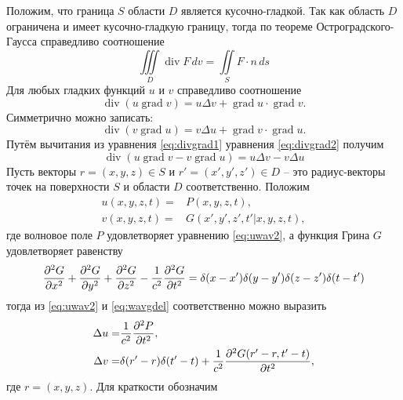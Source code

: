 \documentclass[a4paper, fontsize=14pt]{article}
\newcommand{\divop}{\operatorname{div}}
\newcommand{\gradop}{\operatorname{grad}}
\begin{document}
	 Положим, что граница $S$ области $D$ является кусочно-гладкой. Так как область $D$ ограничена и имеет кусочно-гладкую границу, тогда по
	теореме Остроградского-Гаусса справедливо соотношение
	\begin{equation}
		\iiint\limits_D \divop F \, dv = \iint\limits_S F \cdot n \, ds 
		\label{eq:vgauss}
	\end{equation}
	Для любых гладких функций $u$ и $v$ справедливо соотношение 
	\begin{equation}
		\divop (u \gradop v) = u\Delta v + \gradop u \cdot \gradop v.
		\label{eq:divgrad1}
	\end{equation}
	Симметрично можно записать:
	\begin{equation}
		\divop (v \gradop u) = v\Delta u + \gradop v \cdot \gradop u.
		\label{eq:divgrad2}
	\end{equation}
	Путём вычитания из уравнения \eqref{eq:divgrad1} уравнения \eqref{eq:divgrad2} получим 
	\begin{equation}
		\divop (u \gradop v - v \gradop u)  = u\Delta v - v \Delta u
		\label{eq:divgraddiff}
	\end{equation}
	Пусть векторы $r = (x,y,z) \in S$ и $r' = (x',y',z') \in D$ -- это радиус-векторы точек на поверхности $S$ и области $D$ соответственно.
	Положим 
	\begin{eqnarray}
		u(x,y,z,t) =& P(x,y,z,t),\label{eq:subsu}\\
		v(x,y,z,t) = &G(x',y',z',t'|x,y,z,t),\label{eq:subsv}
	\end{eqnarray}
	где волновое поле $P$ удовлетворяет уравнению \eqref{eq:uwav2}, 
	а функция Грина $G$ удовлетворяет равенству 
	\begin{equation}
		\diff[2]{G}{x}  + \diff[2]{G}{y} +
		\diff[2]{G}{z}  - \frac{1}{c^2} \frac{\partial^2 G}{\partial
			t^2} = \delta(x-x')\delta(y-y')\delta(z-z')\delta(t-t')
		\label{eq:wavgdel}
	\end{equation}
	тогда из \eqref{eq:uwav2} и \eqref{eq:wavgdel} соответственно можно выразить 
\begin{eqnarray}
	\Delta u =& \frac{1}{c^2} \diff[2]{P}{t},\label{eq:subsdu}\\
	\Delta v = &\delta (r' - r) \delta(t' - t) + \frac{1}{c^2} \diff [2]{G(r' -r,t'-t)}{t},\label{eq:subsdv}
\end{eqnarray}
где $r=(x,y,z)$. Для краткости обозначим
\end{document}
